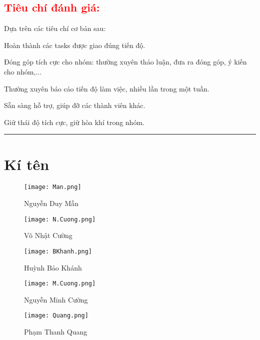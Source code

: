 \documentclass{article}
\begin{document}
\textcolor{red}{\section{\Large{Tiêu chí đánh giá: }}}
\large{Dựa trên các tiêu chí cơ bản sau: } \\
\begin{enumerate}   
    \large{
    \item Hoàn thành các tasks được giao đúng tiến độ.
    \item Đóng góp tích cực cho nhóm: thường xuyên thảo luận, đưa ra đóng góp, ý kiến cho nhóm,...
    \item Thường xuyên báo cáo tiến độ làm việc, nhiều lần trong một tuần.
    \item Sẵn sàng hỗ trợ, giúp đỡ các thành viên khác.
    \item Giữ thái độ tích cực, giữ hòa khí trong nhóm.
    }
    
\end{enumerate}

\noindent
{\color{cyan} \rule{\linewidth}{0.5mm} }

\section*{\Large{Kí tên}}

\begin{figure}[h]

    \centering
    \texttt{[image: Man.png]} \\
    \caption{Nguyễn Duy Mẫn}
    \label{fig:Christ1}
\end{figure}

\begin{figure}[h]

    \centering
    \texttt{[image: N.Cuong.png]} \\
    \caption{Võ Nhật Cường}
    \label{fig:Christ1}
\end{figure}

\begin{figure}[h]

    \centering
    \texttt{[image: BKhanh.png]} \\
    \caption{Huỳnh Bảo Khánh}
    \label{fig:Christ1}
\end{figure}


\begin{figure}[h]
    \centering
    \texttt{[image: M.Cuong.png]} \\
    \caption{Nguyễn Minh Cường}
    \label{fig:Christ1}
\end{figure}

\begin{figure}[h]

    \centering
    \texttt{[image: Quang.png]} \\
    \caption{Phạm Thanh Quang}
    \label{fig:Christ1}
\end{figure}
\end{document}
